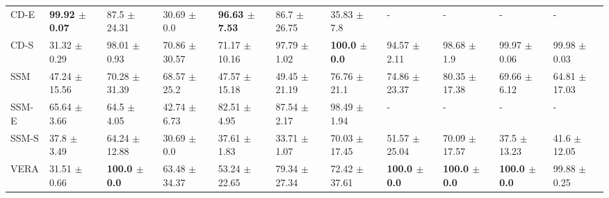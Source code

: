 \begin{tabular}{lllllllllll}
CD-E &  \bfseries{99.92 {\footnotesize $\pm$ 0.07}} &            87.5 {\footnotesize $\pm$ 24.31} &             30.69 {\footnotesize $\pm$ 0.0} &  \bfseries{96.63 {\footnotesize $\pm$ 7.53}} &            86.7 {\footnotesize $\pm$ 26.75} &             35.83 {\footnotesize $\pm$ 7.8} &                                           - &                                           - &                                           - &                                            - \\
CD-S &             31.32 {\footnotesize $\pm$ 0.29} &            98.01 {\footnotesize $\pm$ 0.93} &           70.86 {\footnotesize $\pm$ 30.57} &            71.17 {\footnotesize $\pm$ 10.16} &            97.79 {\footnotesize $\pm$ 1.02} &  \bfseries{100.0 {\footnotesize $\pm$ 0.0}} &            94.57 {\footnotesize $\pm$ 2.11} &             98.68 {\footnotesize $\pm$ 1.9} &            99.97 {\footnotesize $\pm$ 0.06} &             99.98 {\footnotesize $\pm$ 0.03} \\
\midrule
SSM    &            47.24 {\footnotesize $\pm$ 15.56} &           70.28 {\footnotesize $\pm$ 31.39} &            68.57 {\footnotesize $\pm$ 25.2} &            47.57 {\footnotesize $\pm$ 15.18} &           49.45 {\footnotesize $\pm$ 21.19} &            76.76 {\footnotesize $\pm$ 21.1} &           74.86 {\footnotesize $\pm$ 23.37} &           80.35 {\footnotesize $\pm$ 17.38} &            69.66 {\footnotesize $\pm$ 6.12} &            64.81 {\footnotesize $\pm$ 17.03} \\
SSM-E  &             65.64 {\footnotesize $\pm$ 3.66} &             64.5 {\footnotesize $\pm$ 4.05} &            42.74 {\footnotesize $\pm$ 6.73} &             82.51 {\footnotesize $\pm$ 4.95} &            87.54 {\footnotesize $\pm$ 2.17} &            98.49 {\footnotesize $\pm$ 1.94} &                                           - &                                           - &                                           - &                                            - \\
SSM-S  &              37.8 {\footnotesize $\pm$ 3.49} &           64.24 {\footnotesize $\pm$ 12.88} &             30.69 {\footnotesize $\pm$ 0.0} &             37.61 {\footnotesize $\pm$ 1.83} &            33.71 {\footnotesize $\pm$ 1.07} &           70.03 {\footnotesize $\pm$ 17.45} &           51.57 {\footnotesize $\pm$ 25.04} &           70.09 {\footnotesize $\pm$ 17.57} &            37.5 {\footnotesize $\pm$ 13.23} &             41.6 {\footnotesize $\pm$ 12.05} \\
\midrule
VERA   &             31.51 {\footnotesize $\pm$ 0.66} &  \bfseries{100.0 {\footnotesize $\pm$ 0.0}} &           63.48 {\footnotesize $\pm$ 34.37} &            53.24 {\footnotesize $\pm$ 22.65} &           79.34 {\footnotesize $\pm$ 27.34} &           72.42 {\footnotesize $\pm$ 37.61} &  \bfseries{100.0 {\footnotesize $\pm$ 0.0}} &  \bfseries{100.0 {\footnotesize $\pm$ 0.0}} &  \bfseries{100.0 {\footnotesize $\pm$ 0.0}} &             99.88 {\footnotesize $\pm$ 0.25} \\

\end{tabular}
